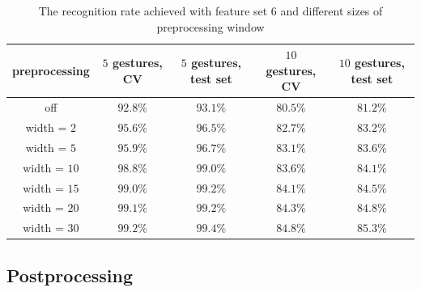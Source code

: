 \begin{table}[htp!]
\begin{center}
	\label{staticpre}
	\caption{The recognition rate achieved with feature set $6$ and different sizes of preprocessing window}
    \begin{tabular}{ccccc}
    \hline
    preprocessing                                                   & $5$ gestures, CV & $5$ gestures, test set & $10$ gestures, CV  & $10$ gestures, test set \\ \hline
    off                     & $92.8\%$ & $93.1\%$  & $80.5\%$ & $81.2\%$ \\ \hline
    width = $2$               & $95.6\%$ & $96.5\%$  & $82.7\%$ & $83.2\%$ \\ \hline
    width = $5$               & $95.9\%$ & $96.7\%$  & $83.1\%$ & $83.6\%$ \\ \hline
    width = $10$              & $98.8\%$ & $99.0\%$  & $83.6\%$ & $84.1\%$ \\ \hline
    width = $15$              & $99.0\%$ & $99.2\%$  & $84.1\%$ & $84.5\%$ \\ \hline
    width = $20$              & $99.1\%$ & $99.2\%$  & $84.3\%$ & $84.8\%$ \\ \hline
    width = $30$              & $99.2\%$ & $99.4\%$  & $84.8\%$ & $85.3\%$ \\ \hline
    \end{tabular}
    \end{center}
\end{table}

\subsection{Postprocessing}



